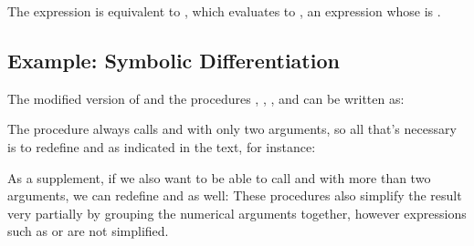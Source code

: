 \begin{exe}[2.55]
    The expression  is equivalent to
    , which evaluates to
    , an expression whose  is .
\end{exe}

\subsection{Example: Symbolic Differentiation}
\label{2.3.2}

\begin{exe}[2.56]
    \label{2.56}
    The modified version of  and the procedures 
    , , , and 
     can be written as:
\end{exe}

\begin{exe}[2.57]
    The  procedure always calls  and 
     with only two arguments, so all that’s necessary is to 
    redefine  and  as indicated in the text, for 
    instance:

    As a supplement, if we also want to be able to call  and 
     with more than two arguments, we can redefine 
     and  as well:
    These procedures also simplify the result very partially by grouping the 
    numerical arguments together, however expressions such as
     or
     are not simplified.
\end{exe}

